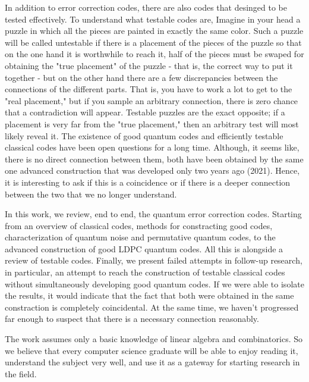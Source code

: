 In addition to error correction codes, there are also codes that desinged to be tested effectively. To understand what testable codes are,  Imagine in your head a puzzle in which all the pieces are painted in exactly the same color. Such a puzzle will be called untestable if there is a placement of the pieces of the puzzle so that on the one hand it is worthwhile to reach it, half of the pieces must be swaped for obtaining  the "true placement" of the puzzle - that is, the correct way to put it together - but on the other hand there are a few discrepancies between the connections of the different parts. That is, you have to work a lot to get to the "real placement," but if you sample an arbitrary connection, there is zero chance that a contradiction will appear. Testable puzzles are the exact opposite; if a placement is very far from the "true placement," then an arbitrary test will most likely reveal it. The existence of good quantum codes and efficiently testable classical codes have been open questions for a long time. Although, it seems like, there is no direct connection between them, both have been obtained by the same one advanced construction that was developed only two years ago (2021). Hence, it is interesting to ask if this is a coincidence or if there is a deeper connection between the two that we no longer understand.

In this work, we review, end to end, the quantum error correction codes. Starting from an overview of classical codes, methods for constracting good codes, characterization of quantum noise and permutative quantum codes, to the advanced construction of good LDPC quantum codes. All this is alongside a review of testable codes. Finally, we present failed attempts in follow-up research, in particular, an attempt to reach the construction of testable classical codes without simultaneously developing good quantum codes. If we were able to isolate the results, it would indicate that the fact that both were obtained in the same constraction is completely coincidental. At the same time, we haven't progressed far enough to suspect that there is a necessary connection reasonably.

The work assumes only a basic knowledge of linear algebra and combinatorics. So we believe that every computer science graduate will be able to enjoy reading it, understand the subject very well, and use it as a gateway for starting research in the field.


